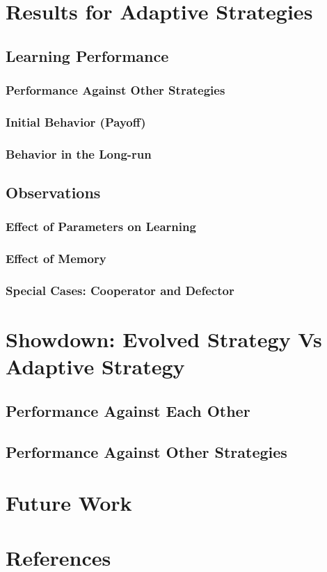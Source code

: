 \documentclass[a4paper]{article}
\begin{document}
	\section{Results for Adaptive Strategies}

	\subsection{Learning Performance}
		
	\subsubsection{Performance Against Other Strategies}
	\subsubsection{Initial Behavior (Payoff)}
	\subsubsection{Behavior in the Long-run}

	\subsection{Observations}
	
	\subsubsection{Effect of Parameters on Learning}
	\subsubsection{Effect of Memory}
	\subsubsection{Special Cases: Cooperator and Defector}

	\section{Showdown: Evolved Strategy Vs Adaptive Strategy}

	\subsection{Performance Against Each Other}
	\subsection{Performance Against Other Strategies}

	\section{Future Work}
			
	\section{References}
\end{document}

